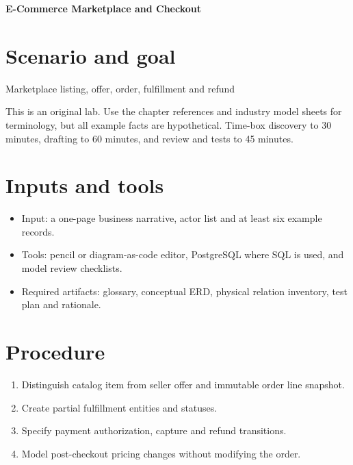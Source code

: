 \documentclass[11pt,letterpaper]{article}
\begin{document}
\begin{center}
{\LARGE\bfseries\color{navy} E-Commerce Marketplace and Checkout}\par
\vspace{0.25em}{\large Practical modeling laboratory}\par
{}
\end{center}
\vspace{0.8em}
\section{Scenario and goal}
Marketplace listing, offer, order, fulfillment and refund

This is an original lab. Use the chapter references and industry model sheets for terminology, but all example facts are hypothetical. Time-box discovery to 30 minutes, drafting to 60 minutes, and review and tests to 45 minutes.


\section{Inputs and tools}
\begin{itemize}
\item Input: a one-page business narrative, actor list and at least six example records.
\item Tools: pencil or diagram-as-code editor, PostgreSQL where SQL is used, and model review checklists.
\item Required artifacts: glossary, conceptual ERD, physical relation inventory, test plan and rationale.
\end{itemize}

\section{Procedure}
\begin{enumerate}
\item Distinguish catalog item from seller offer and immutable order line snapshot.
\item Create partial fulfillment entities and statuses.
\item Specify payment authorization, capture and refund transitions.
\item Model post-checkout pricing changes without modifying the order.
\end{enumerate}
\end{document}
